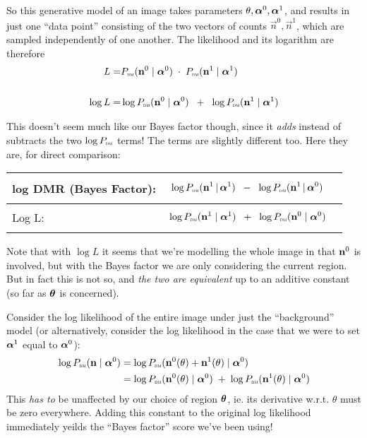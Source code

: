 \documentclass[12pt]{article}
\begin{document}
So this generative model of an image takes parameters $\theta,
\boldsymbol\alpha^0, \boldsymbol\alpha^1$, and results in just one ``data point''
consisting of the two vectors of counts $\vec{n}^0,\vec{n}^1$, which are sampled independently of one another.  The
likelihood and its logarithm are therefore
\begin{align*}
L =& P_\text{\tiny\sc dm}(\mathbf{n}^0 \mid \boldsymbol\alpha^0) \; \cdot \; P_\text{\tiny\sc dm}(\mathbf{n}^1 \mid \boldsymbol\alpha^1) 
\\ \\
\log L =& \log P_\text{\tiny\sc dm}(\mathbf{n}^0 \mid \boldsymbol\alpha^0) \;\; + \;\; \log P_\text{\tiny\sc dm}(\mathbf{n}^1 \mid \boldsymbol\alpha^1) 
\end{align*}

This doesn't seem much like our Bayes factor though, since it
\emph{adds} instead of subtracts the two $\log P_\text{\tiny\sc dm}$ terms! The terms
are slightly different too.  Here they are, for direct comparison:

\begin{tabular}{|l|l|}
\hline
log DMR (Bayes Factor): & 
\parbox{.7\textwidth}{
\begin{align*}
&\log P_\text{\tiny\sc dm}(\mathbf{n}^1 \,|\, \boldsymbol\alpha^1) \;\;-\;\; \log P_\text{\tiny\sc dm}(\mathbf{n}^1 \,|\, \boldsymbol\alpha^0)
\end{align*}
} \\
\hline
Log L: & 
\parbox{.7\textwidth}{
\begin{align*}
& \log P_\text{\tiny\sc dm}(\mathbf{n}^1 \mid \boldsymbol\alpha^1) \;\; + \;\; \log P_\text{\tiny\sc dm}(\mathbf{n}^0 \mid \boldsymbol\alpha^0)
\end{align*}
} \\
\hline
\end{tabular}

Note that with $\log L$ it seems that we're modelling the whole image
in that $\mathbf{n}^0$ is involved, but with the Bayes factor we are only
considering the current region. But in fact this is not so, and {\it
  the two are equivalent} up to an additive constant (so far as
$\boldsymbol\theta$ is concerned).

Consider the log likelihood of the entire image under just the
``background'' model (or alternatively, consider the log likelihood in the case that we were to set $\boldsymbol\alpha^1$ equal to $\boldsymbol\alpha^0$):
\begin{align*}
\log P_\text{\tiny\sc dm}(\mathbf{n} \mid \boldsymbol\alpha^0) 
&= \log P_\text{\tiny\sc dm}(\mathbf{n}^0(\theta) + \mathbf{n}^1(\theta) \mid \boldsymbol\alpha^0)  \\
&= \log P_\text{\tiny\sc dm}(\mathbf{n}^0(\theta) \mid \boldsymbol\alpha^0) \; + \; \log P_\text{\tiny\sc dm}(\mathbf{n}^1(\theta) \mid \boldsymbol\alpha^0) 
\end{align*}
This \emph{has to} be unaffected by our choice of region $\boldsymbol\theta$,
ie. its derivative w.r.t. $\theta$ must be zero everywhere.  Adding
this constant to the original log likelihood immediately yeilds the
``Bayes factor'' score we've been using!
\end{document}
